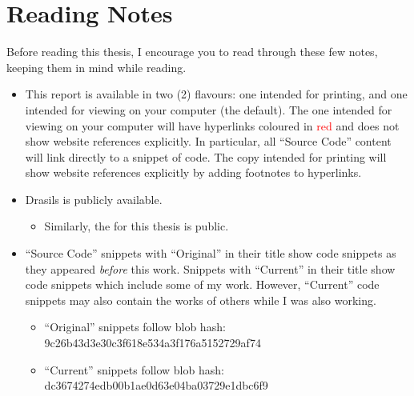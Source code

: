\chapter{Reading Notes}
\label{chap:reading_notes}

Before reading this thesis, I encourage you to read through these few notes,
keeping them in mind while reading.

\begin{itemize}

    \item This report is available in two (2) flavours: one intended for
          printing, and one intended for viewing on your computer (the default).
          The one intended for viewing on your computer will have hyperlinks
          coloured in \textcolor{red}{red} and does not show website references
          explicitly. In particular, all ``Source Code'' content will link
          directly to a snippet of code. The copy intended for printing will
          show website references explicitly by adding footnotes to hyperlinks.

    \item Drasils  is publicly
          available.

          \begin{itemize}

              \item Similarly, the 
                    for this thesis is public.

          \end{itemize}

    \item ``Source Code'' snippets with ``Original'' in their title show code
          snippets as they appeared \textit{before} this work. Snippets with
          ``Current'' in their title show code snippets which include some of my
          work. However, ``Current'' code snippets may also contain the works of
          others while I was also working.

          \begin{itemize}
              \item ``Original'' snippets follow blob hash:
                    9c26b43d3e30c3f618e534a3f176a5152729af74
              \item ``Current'' snippets follow blob hash:
                    dc3674274edb00b1ae0d63e04ba03729e1dbc6f9
          \end{itemize}


\end{itemize}
